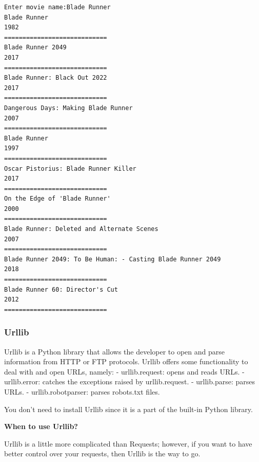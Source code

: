 \documentclass[11pt]{article}
\begin{document}
    \begin{Verbatim}[commandchars=\\\{\}]
Enter movie name:Blade Runner
Blade Runner
1982
============================
Blade Runner 2049
2017
============================
Blade Runner: Black Out 2022
2017
============================
Dangerous Days: Making Blade Runner
2007
============================
Blade Runner
1997
============================
Oscar Pistorius: Blade Runner Killer
2017
============================
On the Edge of 'Blade Runner'
2000
============================
Blade Runner: Deleted and Alternate Scenes
2007
============================
Blade Runner 2049: To Be Human: - Casting Blade Runner 2049
2018
============================
Blade Runner 60: Director's Cut
2012
============================
    \end{Verbatim}

    \hypertarget{urllib}{%
\subsubsection{Urllib}\label{urllib}}

Urllib is a Python library that allows the developer to open and parse
information from HTTP or FTP protocols. Urllib offers some functionality
to deal with and open URLs, namely: - urllib.request: opens and reads
URLs. - urllib.error: catches the exceptions raised by urllib.request. -
urllib.parse: parses URLs. - urllib.robotparser: parses robots.txt
files.

You don't need to install Urllib since it is a part of the built-in
Python library.

\textbf{When to use Urllib?}

Urllib is a little more complicated than Requests; however, if you want
to have better control over your requests, then Urllib is the way to go.
\end{document}
